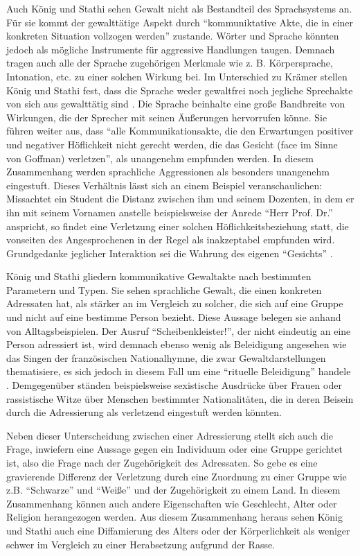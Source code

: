 Auch König und Stathi sehen Gewalt nicht als Bestandteil des Sprachsystems an.
Für sie kommt der gewalttätige Aspekt durch "`kommuniktative Akte, die in einer konkreten Situation vollzogen werden"' \cite[S. 47]{EK10} zustande.
Wörter und Sprache könnten jedoch als mögliche Instrumente für aggressive Handlungen taugen.
Demnach tragen auch alle der Sprache zugehörigen Merkmale wie z. B. Körpersprache, Intonation, etc. zu einer solchen Wirkung bei.
Im Unterschied zu Krämer stellen König und Stathi fest, dass die Sprache weder gewaltfrei noch jegliche Sprechakte von sich aus gewalttätig sind \cite[S. 48]{EK10}.
Die Sprache beinhalte eine große Bandbreite von Wirkungen, die der Sprecher mit seinen Äußerungen hervorrufen könne.
Sie führen weiter aus, dass "`alle Kommunikationsakte, die den Erwartungen positiver und negativer Höflichkeit nicht gerecht werden, die das Gesicht (face im Sinne von Goffman) verletzen"', als unangenehm empfunden werden.
In diesem Zusammenhang werden sprachliche Aggressionen als besonders unangenehm eingestuft.
Dieses Verhältnis lässt sich an einem Beispiel veranschaulichen:
Missachtet ein Student die Distanz zwischen ihm und seinem Dozenten, in dem er ihn mit seinem Vornamen anstelle beispielsweise der Anrede "`Herr Prof. Dr."' anspricht, so findet eine Verletzung einer solchen Höflichkeitsbeziehung statt, die vonseiten des Angesprochenen in der Regel als inakzeptabel empfunden wird.
Grundgedanke jeglicher Interaktion sei die Wahrung des eigenen "`Gesichts"' \cite[S. 50]{EK10}.

König und Stathi gliedern kommunikative Gewaltakte nach bestimmten Parametern und Typen.
Sie sehen sprachliche Gewalt, die einen konkreten Adressaten hat, als stärker an im Vergleich zu solcher, die sich auf eine Gruppe und nicht auf eine bestimme Person bezieht.
Diese Aussage belegen sie anhand von Alltagsbeispielen.
Der Ausruf "`Scheibenkleister!"', der nicht eindeutig an eine Person adressiert ist, wird demnach ebenso wenig als Beleidigung angesehen wie das Singen der französischen Nationalhymne, die zwar Gewaltdarstellungen thematisiere, es sich jedoch in diesem Fall um eine "`rituelle Beleidigung"' handele \cite[S. 51]{EK10}.
Demgegenüber ständen beispielsweise sexistische Ausdrücke über Frauen oder rassistische Witze über Menschen bestimmter Nationalitäten, die in deren Beisein durch die Adressierung als verletzend eingestuft werden könnten.

Neben dieser Unterscheidung zwischen einer Adressierung stellt sich auch die Frage, inwiefern eine Aussage gegen ein Individuum oder eine Gruppe gerichtet ist, also die Frage nach der Zugehörigkeit des Adressaten.
So gebe es eine gravierende Differenz der Verletzung durch eine Zuordnung zu einer Gruppe wie z.B. "`Schwarze"' und "`Weiße"' und der Zugehörigkeit zu einem Land.
In diesem Zusammenhang können auch andere Eigenschaften wie Geschlecht, Alter oder Religion herangezogen werden.
Aus diesem Zusammenhang heraus sehen König und Stathi auch eine Diffamierung des Alters oder der Körperlichkeit als weniger schwer im Vergleich zu einer Herabsetzung aufgrund der Rasse.

